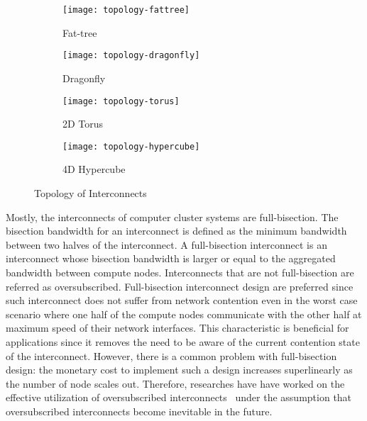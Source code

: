 \begin{figure}
    \centering
    \begin{subfigure}{.45\linewidth}
        \centering
        \texttt{[image: topology-fattree]}
        \caption{Fat-tree}%
        \label{fig:topology-fattree}
    \end{subfigure}
    \begin{subfigure}{.45\linewidth}
        \centering
        \texttt{[image: topology-dragonfly]}
        \caption{Dragonfly}%
        \label{fig:topology-dragonfly}
    \end{subfigure}
    \par\bigskip
    \begin{subfigure}{.45\linewidth}
        \centering
        \texttt{[image: topology-torus]}
        \caption{2D Torus}%
        \label{fig:topology-torus}
    \end{subfigure}
    \begin{subfigure}{.45\linewidth}
        \centering
        \texttt{[image: topology-hypercube]}
        \caption{4D Hypercube}%
        \label{fig:topology-hypercube}
    \end{subfigure}
    \caption{Topology of Interconnects}%
    \label{fig:topology}
\end{figure}

Mostly, the interconnects of computer cluster systems are full-bisection.
The bisection bandwidth for an interconnect is defined as the minimum
bandwidth between two halves of the interconnect. A full-bisection
interconnect is an interconnect whose bisection bandwidth is larger or equal
to the aggregated bandwidth between compute nodes. Interconnects that are
not full-bisection are referred as oversubscribed. Full-bisection interconnect
design are preferred since such interconnect does not suffer from network
contention even in the worst case scenario where one half of the compute nodes
communicate with the other half at maximum speed of their network interfaces.
This characteristic is beneficial for applications since it removes the need
to be aware of the current contention state of the interconnect. However,
there is a common problem with full-bisection design: the monetary cost to
implement such a design increases superlinearly as the number of node scales
out. Therefore, researches have have worked on the effective utilization of
oversubscribed interconnects~\autocite{Leon2017,Michelogiannakis2017} under
the assumption that oversubscribed interconnects become inevitable in the
future.

